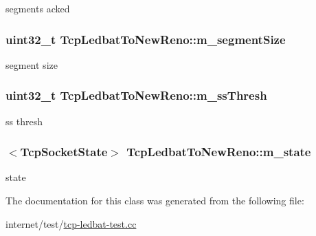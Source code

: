 segments acked 

\subsubsection[{\texorpdfstring{m\+\_\+segment\+Size}{m_segmentSize}}]{\setlength{\rightskip}{0pt plus 5cm}uint32\+\_\+t Tcp\+Ledbat\+To\+New\+Reno\+::m\+\_\+segment\+Size\hspace{0.3cm}{\ttfamily [private]}}\hypertarget{classTcpLedbatToNewReno_ae251eff2153829ab91f7fe937909ae5c}{}\label{classTcpLedbatToNewReno_ae251eff2153829ab91f7fe937909ae5c}


segment size 

\subsubsection[{\texorpdfstring{m\+\_\+ss\+Thresh}{m_ssThresh}}]{\setlength{\rightskip}{0pt plus 5cm}uint32\+\_\+t Tcp\+Ledbat\+To\+New\+Reno\+::m\+\_\+ss\+Thresh\hspace{0.3cm}{\ttfamily [private]}}\hypertarget{classTcpLedbatToNewReno_aeb5a6138db0adef7abd14ba6fec68822}{}\label{classTcpLedbatToNewReno_aeb5a6138db0adef7abd14ba6fec68822}


ss thresh 

\subsubsection[{\texorpdfstring{m\+\_\+state}{m_state}}]{$<${\bf Tcp\+Socket\+State}$>$ Tcp\+Ledbat\+To\+New\+Reno\+::m\+\_\+state\hspace{0.3cm}{\ttfamily [private]}}\hypertarget{classTcpLedbatToNewReno_a9f1cc821153a10a6bc9ef45aeabc59ed}{}\label{classTcpLedbatToNewReno_a9f1cc821153a10a6bc9ef45aeabc59ed}


state 



The documentation for this class was generated from the following file\+:\begin{DoxyCompactItemize}
\item 
internet/test/\hyperlink{tcp-ledbat-test_8cc}{tcp-\/ledbat-\/test.\+cc}\end{DoxyCompactItemize}
